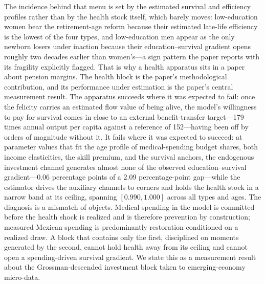 \documentclass[12pt,a4paper]{article}
\begin{document}
The incidence behind that menu is set by the estimated survival and efficiency profiles rather than by the health stock itself, which barely moves: low-education women bear the retirement-age reform because their estimated late-life efficiency is the lowest of the four types, and low-education men appear as the only newborn losers under inaction because their education--survival gradient opens roughly two decades earlier than women's---a sign pattern the paper reports with its fragility explicitly flagged. That is why a health apparatus sits in a paper about pension margins. The health block is the paper's methodological contribution, and its performance under estimation is the paper's central measurement result. The apparatus succeeds where it was expected to fail: once the felicity carries an estimated flow value of being alive, the model's willingness to pay for survival comes in close to an external benefit-transfer target---179 times annual output per capita against a reference of 152---having been off by orders of magnitude without it. It fails where it was expected to succeed: at parameter values that fit the age profile of medical-spending budget shares, both income elasticities, the skill premium, and the survival anchors, the endogenous investment channel generates almost none of the observed education--survival gradient---0.06 percentage points of a 2.09 percentage-point gap---while the estimator drives the auxiliary channels to corners and holds the health stock in a narrow band at its ceiling, spanning $[0.990, 1.000]$ across all types and ages. The diagnosis is a mismatch of objects. Medical spending in the model is committed before the health shock is realized and is therefore prevention by construction; measured Mexican spending is predominantly restoration conditioned on a realized draw. A block that contains only the first, disciplined on moments generated by the second, cannot hold health away from its ceiling and cannot open a spending-driven survival gradient. We state this as a measurement result about the Grossman-descended investment block taken to emerging-economy micro-data.
\end{document}

